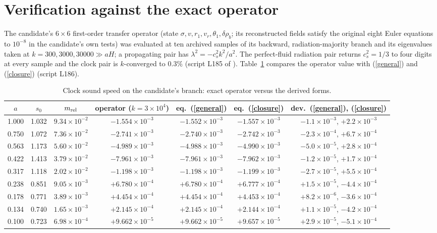 \documentclass[11pt,letterpaper]{article}
\begin{document}
\section{Verification against the exact operator}
The candidate's $6\times6$ first-order transfer operator (state $\sigma,v,r_1,v_r,\theta_1,\delta\rho_b$; its reconstructed fields satisfy the original eight Euler equations to $10^{-8}$ in the candidate's own tests) was evaluated at ten archived samples of its backward, radiation-majority branch and its eigenvalues taken at $k=300,3000,30000\gg aH$; a propagating pair has $\lambda^2=-c_s^2k^2/a^2$. The perfect-fluid radiation pair returns $c_s^2=1/3$ to four digits at every sample and the clock pair is $k$-converged to $0.3\%$ (script L185 of \cite{repo}). Table~\ref{t} compares the operator value with (\ref{general}) and (\ref{closure}) (script L186).
\begin{table}[h]\centering\caption{Clock sound speed on the candidate's branch: exact operator versus the derived forms.}\label{t}
\begin{tabular}{ccccccc}\toprule
$a$ & $s_0$ & $m_{\rm rel}$ & operator ($k=3\times10^4$) & eq.~(\ref{general}) & eq.~(\ref{closure}) & dev.\ (\ref{general}), (\ref{closure})\\\midrule
1.000 & 1.032 & $9.34\times10^{-2}$ & $-1.554\times10^{-3}$ & $-1.552\times10^{-3}$ & $-1.557\times10^{-3}$ & $-1.1\times10^{-3}$, $+2.2\times10^{-3}$\\
0.750 & 1.072 & $7.36\times10^{-2}$ & $-2.741\times10^{-3}$ & $-2.740\times10^{-3}$ & $-2.742\times10^{-3}$ & $-2.3\times10^{-4}$, $+6.7\times10^{-4}$\\
0.563 & 1.173 & $5.60\times10^{-2}$ & $-4.989\times10^{-3}$ & $-4.988\times10^{-3}$ & $-4.990\times10^{-3}$ & $-5.0\times10^{-5}$, $+2.8\times10^{-4}$\\
0.422 & 1.413 & $3.79\times10^{-2}$ & $-7.961\times10^{-3}$ & $-7.961\times10^{-3}$ & $-7.962\times10^{-3}$ & $-1.2\times10^{-5}$, $+1.7\times10^{-4}$\\
0.317 & 1.118 & $2.02\times10^{-2}$ & $-1.198\times10^{-3}$ & $-1.198\times10^{-3}$ & $-1.199\times10^{-3}$ & $-2.7\times10^{-5}$, $+5.5\times10^{-4}$\\
0.238 & 0.851 & $9.05\times10^{-3}$ & $+6.780\times10^{-4}$ & $+6.780\times10^{-4}$ & $+6.777\times10^{-4}$ & $+1.5\times10^{-5}$, $-4.4\times10^{-4}$\\
0.178 & 0.771 & $3.89\times10^{-3}$ & $+4.454\times10^{-4}$ & $+4.454\times10^{-4}$ & $+4.453\times10^{-4}$ & $+8.2\times10^{-6}$, $-3.6\times10^{-4}$\\
0.134 & 0.740 & $1.65\times10^{-3}$ & $+2.145\times10^{-4}$ & $+2.145\times10^{-4}$ & $+2.144\times10^{-4}$ & $+1.1\times10^{-5}$, $-4.2\times10^{-4}$\\
0.100 & 0.723 & $6.98\times10^{-4}$ & $+9.662\times10^{-5}$ & $+9.662\times10^{-5}$ & $+9.657\times10^{-5}$ & $+2.9\times10^{-5}$, $-5.1\times10^{-4}$\\\bottomrule
\end{tabular}\end{table}
\end{document}
